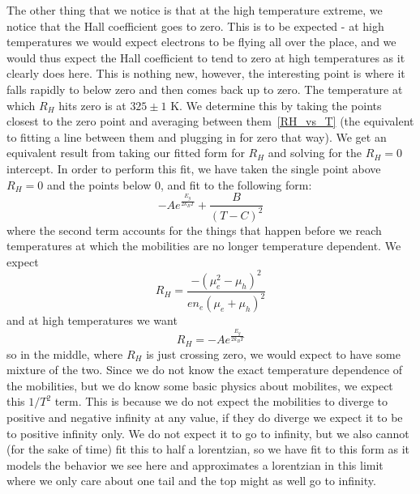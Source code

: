 \documentclass[reprint, nobibnotes, amssymb, amsmath, amsfonts, physics, mathtools, mathrsfs, floatfix]{revtex4-1}
\begin{document}
    The other thing that we notice is that at the high temperature extreme, we notice that the Hall coefficient goes to zero.  This is to be expected - at high temperatures we would expect electrons to be flying all over the place, and we would thus expect the Hall coefficient to tend to zero at high temperatures as it clearly does here.  This is nothing new, however, the interesting point is where it falls rapidly to below zero and then comes back up to zero.  The temperature at which $R_H$ hits zero is at $325\pm1$ K.  We determine this by taking the points closest to the zero point and averaging between them~\ref{RH_vs_T} (the equivalent to fitting a line between them and plugging in for zero that way).  We get an equivalent result from taking our fitted form for $R_H$ and solving for the $R_H = 0$ intercept.  In order to perform this fit, we have taken the single point above $R_H = 0$ and the points below 0, and fit to the following form:
    \begin{equation}
      -Ae^{\frac{E_g}{2 k_B T}} + \frac{B}{(T-C)^2}
    \end{equation}
    where the second term accounts for the things that happen before we reach temperatures at which the mobilities are no longer temperature dependent.  We expect
    \begin{equation}
      R_H = \frac{-(\mu_e^2 - \mu_h)^2}{en_e(\mu_e + \mu_h)^2}
    \end{equation}
    and at high temperatures we want
    \begin{equation}
      R_H = -Ae^{\frac{E_g}{2 k_B T}}
    \end{equation}
    so in the middle, where $R_H$ is just crossing zero, we would expect to have some mixture of the two.  Since we do not know the exact temperature dependence of the mobilities, but we do know some basic physics about mobilites, we expect this $1/T^2$ term.  This is because we do not expect the mobilities to diverge to positive and negative infinity at any value, if they do diverge we expect it to be to positive infinity only.  We do not expect it to go to infinity, but we also cannot (for the sake of time) fit this to half a lorentzian, so we have fit to this form as it models the behavior we see here and approximates a lorentzian in this limit where we only care about one tail and the top might as well go to infinity.
\end{document}
